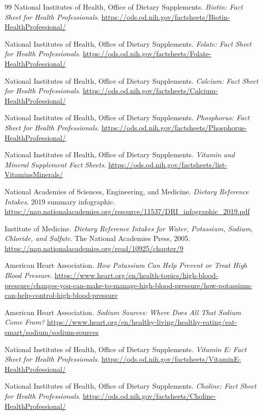 \begin{thebibliography}{99}
 National Institutes of Health, Office of Dietary Supplements. \emph{Biotin: Fact Sheet for Health Professionals}. \url{https://ods.od.nih.gov/factsheets/Biotin-HealthProfessional/}

 National Institutes of Health, Office of Dietary Supplements. \emph{Folate: Fact Sheet for Health Professionals}. \url{https://ods.od.nih.gov/factsheets/Folate-HealthProfessional/}

 National Institutes of Health, Office of Dietary Supplements. \emph{Calcium: Fact Sheet for Health Professionals}. \url{https://ods.od.nih.gov/factsheets/Calcium-HealthProfessional/}

 National Institutes of Health, Office of Dietary Supplements. \emph{Phosphorus: Fact Sheet for Health Professionals}. \url{https://ods.od.nih.gov/factsheets/Phosphorus-HealthProfessional/}

 National Institutes of Health, Office of Dietary Supplements. \emph{Vitamin and Mineral Supplement Fact Sheets}. \url{https://ods.od.nih.gov/factsheets/list-VitaminsMinerals/}

 National Academies of Sciences, Engineering, and Medicine. \emph{Dietary Reference Intakes}. 2019 summary infographic. \url{https://nap.nationalacademies.org/resource/11537/DRI_infographic_2019.pdf}

 Institute of Medicine. \emph{Dietary Reference Intakes for Water, Potassium, Sodium, Chloride, and Sulfate}. The National Academies Press, 2005. \url{https://nap.nationalacademies.org/read/10925/chapter/9}

 American Heart Association. \emph{How Potassium Can Help Prevent or Treat High Blood Pressure}. \url{https://www.heart.org/en/health-topics/high-blood-pressure/changes-you-can-make-to-manage-high-blood-pressure/how-potassium-can-help-control-high-blood-pressure}

 American Heart Association. \emph{Sodium Sources: Where Does All That Sodium Come From?} \url{https://www.heart.org/en/healthy-living/healthy-eating/eat-smart/sodium/sodium-sources}

 National Institutes of Health, Office of Dietary Supplements. \emph{Vitamin E: Fact Sheet for Health Professionals}. \url{https://ods.od.nih.gov/factsheets/VitaminE-HealthProfessional/}

 National Institutes of Health, Office of Dietary Supplements. \emph{Choline: Fact Sheet for Health Professionals}. \url{https://ods.od.nih.gov/factsheets/Choline-HealthProfessional/}


\end{thebibliography}
